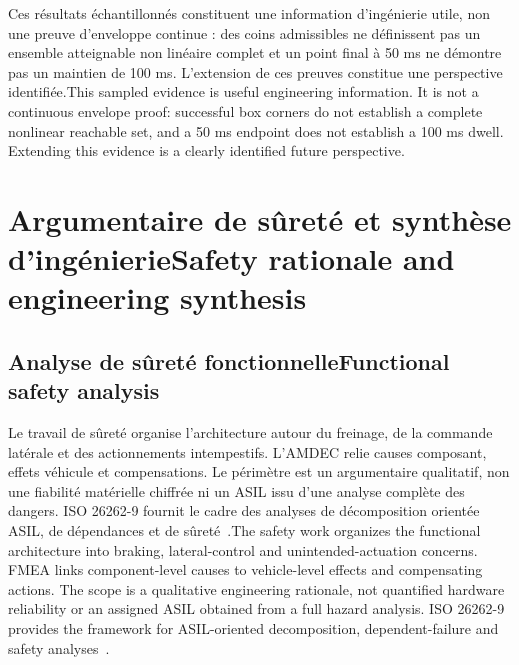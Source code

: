 \documentclass[11pt,a4paper,oneside]{report}
\newcommand{\bi}[2]{\iffrench #2\else #1\fi}
\newcommand{\chap}[2]{\chapter{\bi{#1}{#2}}}
\renewcommand{\sec}[2]{\section{\bi{#1}{#2}}}
\begin{document}
\bi{This sampled evidence is useful engineering information. It is not a continuous envelope proof: successful box corners do not establish a complete nonlinear reachable set, and a 50 ms endpoint does not establish a 100 ms dwell. Extending this evidence is a clearly identified future perspective.}{Ces résultats échantillonnés constituent une information d'ingénierie utile, non une preuve d'enveloppe continue : des coins admissibles ne définissent pas un ensemble atteignable non linéaire complet et un point final à 50 ms ne démontre pas un maintien de 100 ms. L'extension de ces preuves constitue une perspective identifiée.}
\chap{Safety rationale and engineering synthesis}{Argumentaire de sûreté et synthèse d'ingénierie}
\sec{Functional safety analysis}{Analyse de sûreté fonctionnelle}
\bi{The safety work organizes the functional architecture into braking, lateral-control and unintended-actuation concerns. FMEA links component-level causes to vehicle-level effects and compensating actions. The scope is a qualitative engineering rationale, not quantified hardware reliability or an assigned ASIL obtained from a full hazard analysis. ISO 26262-9 provides the framework for ASIL-oriented decomposition, dependent-failure and safety analyses~\cite{iso}.}{Le travail de sûreté organise l'architecture autour du freinage, de la commande latérale et des actionnements intempestifs. L'AMDEC relie causes composant, effets véhicule et compensations. Le périmètre est un argumentaire qualitatif, non une fiabilité matérielle chiffrée ni un ASIL issu d'une analyse complète des dangers. ISO 26262-9 fournit le cadre des analyses de décomposition orientée ASIL, de dépendances et de sûreté~\cite{iso}.}
\end{document}
